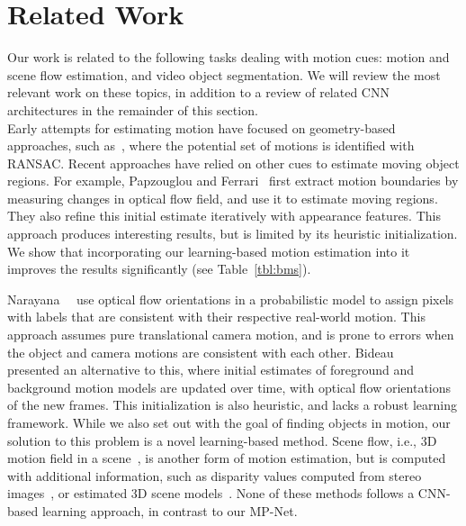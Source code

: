\documentclass[10pt,twocolumn,letterpaper]{article}
\begin{document}
\vspace{-0.2cm}
\section{Related Work}
\vspace{-0.2cm}
Our work is related to the following tasks dealing with motion cues: motion and
scene flow estimation, and video object segmentation. We will review the most
relevant work on these topics, in addition to a review of related CNN
architectures in the remainder of this section.\\

\vspace{-0.2cm}
 Early attempts for estimating motion have
focused on geometry-based approaches, such as~\cite{Torr98}, where the
potential set of motions is identified with RANSAC. Recent approaches have
relied on other cues to estimate moving object regions. For example, Papzouglou
and Ferrari~\cite{papazoglou2013fast} first extract motion boundaries by
measuring changes in optical flow field, and use it to estimate moving regions.
They also refine this initial estimate iteratively with appearance features.
This approach produces interesting results, but is limited by its heuristic
initialization. We show that incorporating our learning-based motion estimation
into it improves the results significantly (see Table~\ref{tbl:bms}).

Narayana~\etal~\cite{Narayana13} use optical flow orientations in a
probabilistic model to assign pixels with labels that are consistent with their
respective real-world motion. This approach assumes pure translational camera
motion, and is prone to errors when the object and camera motions are
consistent with each other. Bideau~\etal~\cite{Bideau16} presented an
alternative to this, where initial estimates of foreground and background
motion models are updated over time, with optical flow orientations of the new
frames. This initialization is also heuristic, and lacks a robust learning
framework.  While we also set out with the goal of finding objects in motion, our
solution to this problem is a novel learning-based method. Scene flow, i.e., 3D
motion field in a scene~\cite{Vedula05}, is another form of motion estimation,
but is computed with additional information, such as disparity values computed
from stereo images~\cite{Huguet07,Wedel11}, or estimated 3D scene
models~\cite{Vogel15}. None of these methods follows a CNN-based learning
approach, in contrast to our MP-Net. \\
\end{document}
